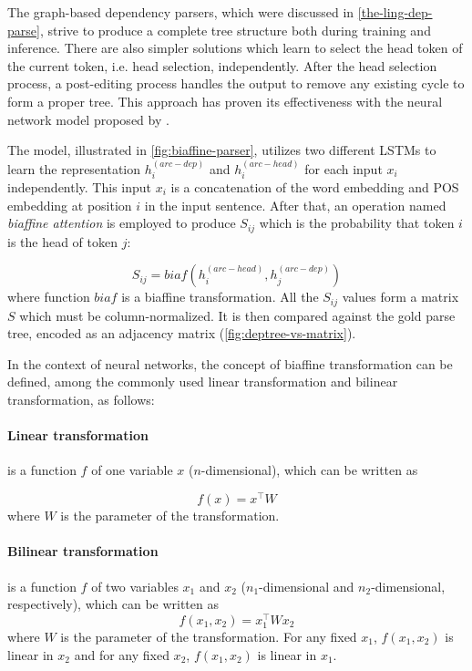 The graph-based dependency parsers, which were discussed in \cref{the-ling-dep-parse}, strive to produce a complete tree structure both during training and inference.
There are also simpler solutions which learn to select the head token of the current token, i.e. head selection, independently.
After the head selection process, a post-editing process handles the output to remove any existing cycle to form a proper tree.
This approach has proven its effectiveness with the neural network model proposed by \cite{dozat:biaffine:2017}.

The model, illustrated in \cref{fig:biaffine-parser}, utilizes two different LSTMs to learn the representation $h^{(arc-dep)}_i$ and $h^{(arc-head)}_i$ for each input $x_i$ independently. This input $x_i$ is a concatenation of the word embedding and POS embedding at position $i$ in the input sentence.
After that, an operation named \textit{biaffine attention} is employed to produce $S_{ij}$ which is the probability that token $i$ is the head of token $j$:

\begin{equation}
    S_{ij} = biaf(h^{(arc-head)}_i, h^{(arc-dep)}_j)    
\end{equation}
where function $biaf$ is a biaffine transformation. All the $S_{ij}$ values form a matrix $S$ which must be column-normalized.
It is then compared against the gold parse tree, encoded as an adjacency matrix (\cref{fig:deptree-vs-matrix}).

In the context of neural networks, the concept of biaffine transformation can be defined, among the commonly used linear transformation and bilinear transformation, as follows:

\paragraph{Linear transformation} is a function $f$ of one variable $x$ ($n$-dimensional), which can be written as 

\begin{equation}
    f(x)=x^\top W
\end{equation}
where $W$ is the parameter of the transformation.

\paragraph{Bilinear transformation} is a function $f$ of two variables $x_1$ and $x_2$ ($n_1$-dimensional and $n_2$-dimensional, respectively), which can be written as 
\begin{equation}
    f(x_1, x_2)=x_1^\top W x_2
\end{equation}
where $W$ is the parameter of the transformation. For any fixed $x_1$, $f(x_1, x_2)$ is linear in $x_2$ and for any fixed $x_2$, $f(x_1, x_2)$ is linear in $x_1$.

